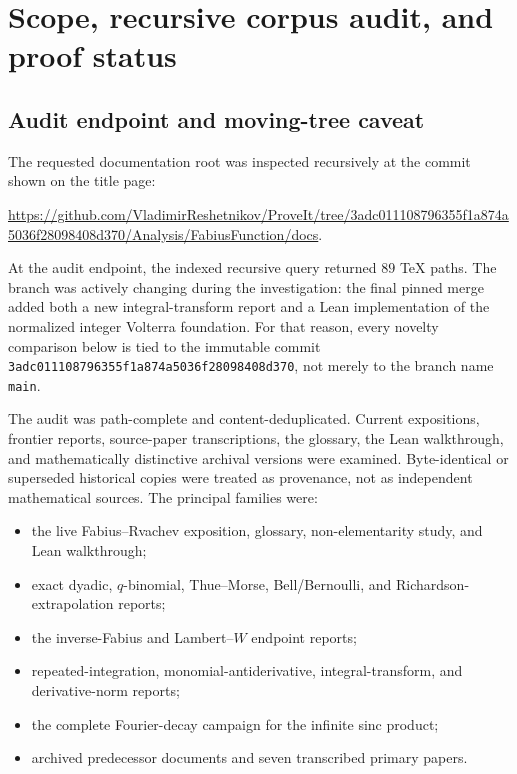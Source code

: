 \documentclass[11pt,oneside]{article}
\numberwithin{equation}{section}
\theoremstyle{plain}
\theoremstyle{definition}
\theoremstyle{remark}
\newcommand{\RepoCommit}{\nolinkurl{3adc011108796355f1a874a5036f28098408d370}}
\newcommand{\RepoRoot}{\url{https://github.com/VladimirReshetnikov/ProveIt/tree/3adc011108796355f1a874a5036f28098408d370/Analysis/FabiusFunction/docs}}
\begin{document}
\begin{abstract}
The report also develops complex-order resolvents containing $F$ and $Q$,
fractional autocorrelation energies of the infinite sinc product, a catalog
of definite and indefinite integral identities, reproducible numerical
checks, and a Lean formalization roadmap.  ``New'' throughout means new
relative to the pinned repository corpus after a targeted collision audit;
it is not a claim of universal publication priority.
\end{abstract}

\tableofcontents
\clearpage

\section{Scope, recursive corpus audit, and proof status}
\label{sec:audit}

\subsection{Audit endpoint and moving-tree caveat}

The requested documentation root was inspected recursively at the commit
shown on the title page:
\begin{center}
\RepoRoot.
\end{center}
At the audit endpoint, the indexed recursive query returned $89$ TeX paths.
The branch was actively changing during the investigation: the final pinned
merge added both a new integral-transform report and a Lean implementation of
the normalized integer Volterra foundation.  For that reason, every novelty
comparison below is tied to the immutable commit \RepoCommit, not merely to
the branch name \texttt{main}.

The audit was path-complete and content-deduplicated.  Current expositions,
frontier reports, source-paper transcriptions, the glossary, the Lean
walkthrough, and mathematically distinctive archival versions were examined.
Byte-identical or superseded historical copies were treated as provenance,
not as independent mathematical sources.  The principal families were:
\begin{itemize}
\item the live Fabius--Rvachev exposition, glossary, non-elementarity study,
      and Lean walkthrough;
\item exact dyadic, $q$-binomial, Thue--Morse, Bell/Bernoulli, and
      Richardson-extrapolation reports;
\item the inverse-Fabius and Lambert--$W$ endpoint reports;
\item repeated-integration, monomial-antiderivative, integral-transform, and
      derivative-norm reports;
\item the complete Fourier-decay campaign for the infinite sinc product;
\item archived predecessor documents and seven transcribed primary papers.
\end{itemize}
\end{document}
